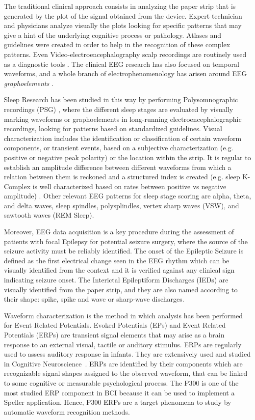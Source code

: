 \documentclass[brainsci,article,submit,moreauthors,pdftex,10pt,a4paper]{mdpi}
\begin{document}
The traditional clinical approach consists in analyzing the paper strip that is generated by the plot of the signal obtained from the device.  Expert technician and physicians analyze visually the plots looking for specific patterns that may give a hint of the underlying cognitive process or pathology.   Atlases and guidelines were created in order to help in the recognition of these complex patterns.   Even Video-electroencephalography scalp recordings are routinely used as a diagnostic tools \citep{Giagante2003} .  The clinical EEG research has also focused on temporal waveforms, and a whole branch of electrophenomenology has arisen around EEG \textit{graphoelements} \citep{Schomer2010}.  

Sleep Research has been studied in this way by performing Polysomnographic recordings (PSG)  \citep{Rodenbeck2006}, where the different sleep stages are evaluated by visually marking waveforms or graphoelements in long-running electroencephalographic recordings, looking for patterns based on standardized guidelines.   Visual characterization includes the identification or classification of certain waveform components, or transient events, based on a subjective characterization (e.g. positive or negative peak polarity) or the location within the strip.  It is regular to establish an amplitude difference between different waveforms from which a relation between them is reckoned and a structured index is created (e.g. sleep K-Complex is well characterized based on rates between positive vs negative amplitude) \citep{Uchida1999}.  Other relevant EEG patterns for sleep stage scoring are alpha, theta, and delta waves,  sleep spindles, polysplindles, vertex sharp waves (VSW), and sawtooth waves (REM Sleep).

Moreover, EEG data acquisition is a key procedure during the assessment of patients with focal Epilepsy for potential seizure surgery, where the source of the seizure activity must be reliably identified. The onset of the Epileptic Seizure is defined as the first electrical change seen in the EEG rhythm which can be visually identified from the context and it is verified against any clinical sign indicating seizure onset.  The Interictal Epileptiform Discharges (IEDs) are visually identified from the paper strip, and they are also named according to their shape: spike, spike and wave or sharp-wave discharges\citep{EEGIntro}.  

Waveform characterization is the method in which analysis has been performed for Event Related Potentials.  Evoked Potentials (EPs) and Event Related Potentials (ERPs) are transient signal elements that may arise as a brain response to an external visual, tactile or auditory stimulus.  ERPs are regularly used to assess auditory response in infants.  They are extensively used and studied in Cognitive Neuroscience~\citep{Luck2005}.  ERPs are identified by their components which are recognizable signal shapes assigned to the observed waveform, that can be linked to some cognitive or measurable psychological process.   The P300 is one of the most studied ERP component in BCI because it can be used to implement a Speller application.  Hence, P300 ERPs are a target phenomena to study by automatic waveform recognition methods.
\end{document}
